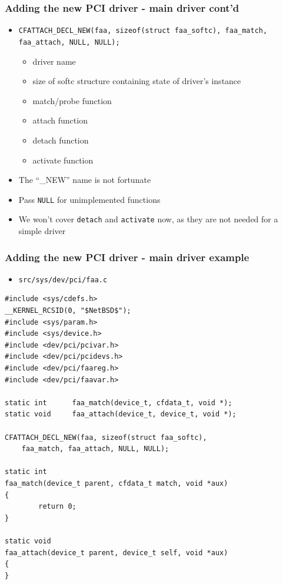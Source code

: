 \documentclass[dvipsnames,table]{beamer}
\begin{document}
\begin{frame}
\frametitle{Adding the new PCI driver - main driver cont'd}
\begin{itemize}
	\item {\tt CFATTACH\_DECL\_NEW(faa, sizeof(struct faa\_softc),
    faa\_match, faa\_attach, NULL, NULL);}
	\begin{itemize}
		\item driver name
		\item size of softc structure containing state of driver's instance
		\item match/probe function
		\item attach function
		\item detach function
		\item activate function
	\end{itemize}
	\item The ``\_NEW'' name is not fortunate
	\item Pass {\tt NULL} for unimplemented functions
	\item We won't cover {\tt detach} and {\tt activate} now, as they are not needed for a simple driver
\end{itemize}
\end{frame}

\begin{frame}[fragile]
\frametitle{Adding the new PCI driver - main driver example}
\scriptsize
\begin{itemize}
	\item {\tt src/sys/dev/pci/faa.c}
\end{itemize}
\begin{lstlisting}
#include <sys/cdefs.h>
__KERNEL_RCSID(0, "$NetBSD$");
#include <sys/param.h>
#include <sys/device.h>
#include <dev/pci/pcivar.h>
#include <dev/pci/pcidevs.h>
#include <dev/pci/faareg.h>
#include <dev/pci/faavar.h>

static int      faa_match(device_t, cfdata_t, void *);
static void     faa_attach(device_t, device_t, void *);

CFATTACH_DECL_NEW(faa, sizeof(struct faa_softc),
    faa_match, faa_attach, NULL, NULL);

static int
faa_match(device_t parent, cfdata_t match, void *aux)
{
        return 0;
}

static void
faa_attach(device_t parent, device_t self, void *aux)
{ 
}
\end{lstlisting}
\end{frame}
\end{document}
